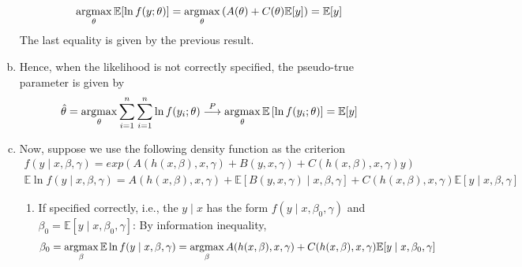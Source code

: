 \documentclass[11pt]{elegantbook}
\newcommand{\argmax}{\operatornamewithlimits{argmax}}
\begin{document}
\begin{enumerate}[(a).]
\begin{equation}
        \begin{aligned}
            \argmax_\theta \mathbb{E}[\ln f(y;\theta)] = \argmax_\theta \left(A(\theta)+C(\theta)\mathbb{E}[y]\right)=\mathbb{E}[y]
        \end{aligned}
        \nonumber
    \end{equation}
    The last equality is given by the previous result.
    \item Hence, when the likelihood is not correctly specified, the pseudo-true parameter is given by
    \begin{equation}
        \begin{aligned}
            \hat{\theta}=\argmax_\theta \sum_{i=1}^n\sum_{i=1}^n\ln f(y_i;\theta) \stackrel{P}{\longrightarrow} \argmax_\theta \mathbb{E}\left[\ln f(y_i;\theta)\right]=\mathbb{E}[y]
        \end{aligned}
        \nonumber
    \end{equation}
    \item Now, suppose we use the following density function as the criterion
    \begin{equation}
        \begin{aligned}
            f(y\mid x,\beta,\gamma)=exp\left(A(h(x,\beta),x,\gamma)+B(y,x,\gamma)+C(h(x,\beta),x,\gamma)y\right)
        \end{aligned}
        \nonumber
    \end{equation}
    \begin{equation}
        \begin{aligned}
            \mathbb{E}\ln f(y\mid x,\beta,\gamma)=A(h(x,\beta),x,\gamma)+\mathbb{E}[B(y,x,\gamma)\mid x,\beta,\gamma]+C(h(x,\beta),x,\gamma)\mathbb{E}[y\mid x,\beta,\gamma]
        \end{aligned}
        \nonumber
    \end{equation}
    \begin{enumerate}[$\circ$]
        \item If specified correctly, i.e., the $y\mid x$ has the form $f(y\mid x,\beta_0,\gamma)$ and $\beta_0=\mathbb{E}[y\mid x,\beta_0,\gamma]$: By information inequality,
        \begin{equation}
            \begin{aligned}
                \beta_0=\argmax_\beta\mathbb{E}\ln f(y\mid x,\beta,\gamma)=\argmax_\beta A(h(x,\beta),x,\gamma)+C(h(x,\beta),x,\gamma)\mathbb{E}[y\mid x,\beta_0,\gamma]
            \end{aligned}
            \nonumber
        \end{equation}

\end{enumerate}
\end{enumerate}
\end{document}
